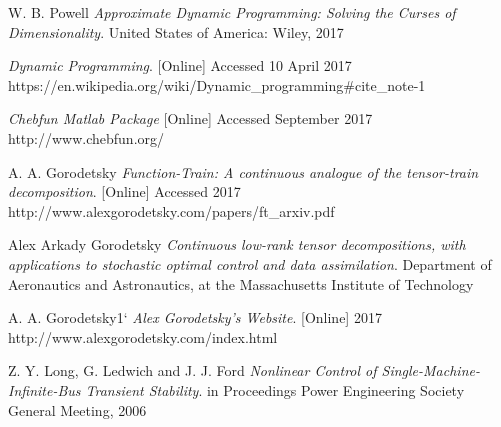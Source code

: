\documentclass[11pt,draftd]{article}
\begin{document}
\begin{thebibliography}{9}
	W. B. Powell
	\textit{Approximate Dynamic Programming: Solving the Curses of Dimensionality}.
	United States of America: Wiley, 2017
	
	\textit{Dynamic Programming}.
	[Online] Accessed 10 April 2017
	https://en.wikipedia.org/wiki/Dynamic\_programming\#cite\_note-1
	
	\textit{Chebfun Matlab Package}
	[Online] Accessed September 2017
	http://www.chebfun.org/
	
	A. A. Gorodetsky
	\textit{Function-Train: A continuous analogue of the tensor-train decomposition}.
	[Online] Accessed 2017
	http://www.alexgorodetsky.com/papers/ft\_arxiv.pdf
		
	Alex Arkady Gorodetsky
	\textit{Continuous low-rank tensor decompositions, with applications to stochastic optimal control and data assimilation}.
	Department of Aeronautics and Astronautics, at the Massachusetts Institute of Technology
	
	A. A. Gorodetsky1`
	\textit{Alex Gorodetsky's Website}.
	[Online] 2017
	http://www.alexgorodetsky.com/index.html
	
	Z. Y. Long, G. Ledwich and J. J. Ford
	\textit{Nonlinear Control of Single-Machine-Infinite-Bus Transient Stability}.
	in Proceedings Power Engineering Society General Meeting, 2006
	
	
\end{thebibliography}
\newpage
\end{document}
